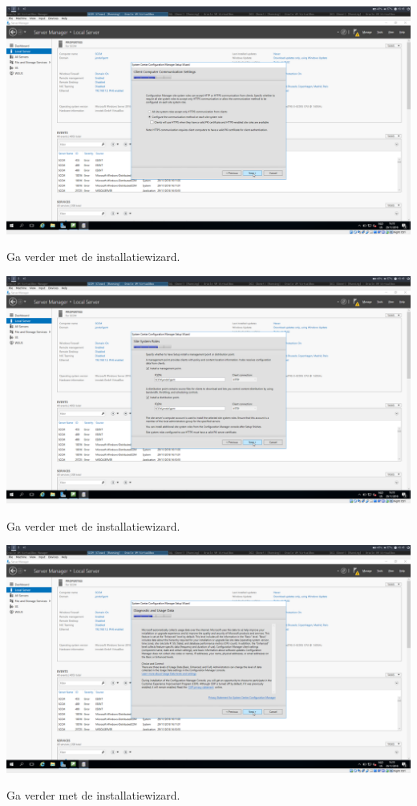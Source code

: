 \documentclass[a4paper]{article}
\begin{document}
\begin{center}
\includegraphics[width=15cm]{Pictures/SCCM/6/1543504680.png}

Ga verder met de installatiewizard.
\end{center}
\begin{center}
\includegraphics[width=15cm]{Pictures/SCCM/6/1543504684.png}

Ga verder met de installatiewizard.
\end{center}
\begin{center}
\includegraphics[width=15cm]{Pictures/SCCM/6/1543504686.png}

Ga verder met de installatiewizard.
\end{center}
\end{document}
